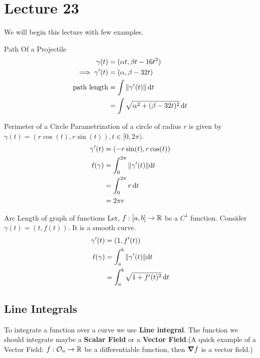 \documentclass[../Analysis-3.tex]{subfiles}
\begin{document}
\chapter*{Lecture 23} %
\setcounter{chapter}{23} %
\setcounter{section}{0}
\setcounter{equation}{0}
\setcounter{figure}{0}


We will begin this lecture with few examples.
\begin{Eg}{Path Of a Projectile}{}
  \begin{align*}
    \gamma(t)           & =(\alpha t, \beta t-16t^2)                     \\
    \implies \gamma'(t) & = (\alpha, \beta -32t)                         \\
    \text{path length}  & = \int \norm{\gamma'(t)}\dd{t}                 \\
                        & = \int \sqrt{\alpha^2 +(\beta-32t)^2} \, \dd t
  \end{align*}
\end{Eg}

\begin{Eg}{Perimeter of a Circle}{}
  Parametrization of a circle of radius $r$ is given by $\gamma(t) = (r\cos(t),r\sin(t)), t \in [0,2\pi)$.
  \begin{align*}
    \gamma'(t)    & = (-r\sin(t),r\cos(t))                    \\
    \ell (\gamma) & = \int_{0}^{2\pi} \norm{\gamma'(t)} \dd t \\
                  & = \int_{0}^{2\pi} r \, \dd t              \\
                  & = 2\pi r
  \end{align*}
\end{Eg}

\begin{Eg}{Arc Length of graph of functions}{}
  Let, $f : [a,b]\to \mathbb{R}$ be a $C^1$ function. Consider $\gamma(t)=(t, f(t))$. It is a smooth curve.
  \begin{align*}
    \gamma'(t)    & = (1,f'(t))                                \\
    \ell (\gamma) & = \int_{a}^{b} \norm{\gamma'(t)} \dd t     \\
                  & = \int_{a}^{b} \sqrt{1 + f'(t)^2} \, \dd t
  \end{align*}
\end{Eg}

\section{Line Integrals}
To integrate a function over a curve we use \textbf{Line integral}. The function we should integrate maybe a \textbf{Scalar Field} or a \textbf{Vector Field}.(A quick example of a Vector Field: $f : \mathcal{O}_{n} \to \mathbb{R}$ be a differentiable function, then $\grad f$ is a vector field.)
\end{document}
